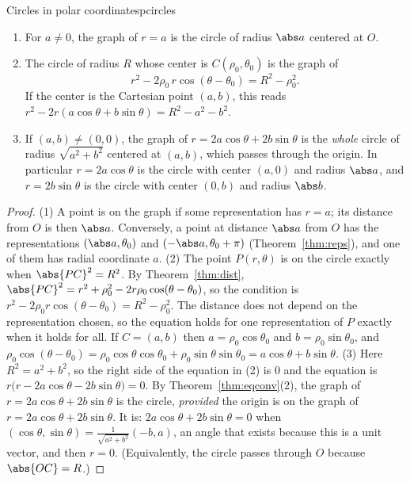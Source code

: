 \documentclass[11pt]{article}
\begin{document}
\begin{thm}{Circles in polar coordinates}{pcircles}
\begin{enumerate}[nosep]
  \item For $a\ne0$, the graph of $r=a$ is the circle of radius $\abs a$ centered at $O$.
  \item The circle of radius $R$ whose center is $C(\rho_0,\theta_0)$ is the graph of
  \[
  r^2-2\rho_0\,r\cos(\theta-\theta_0)=R^2-\rho_0^2 .
  \]
  If the center is the Cartesian point $(a,b)$, this reads $r^2-2r(a\cos\theta+b\sin\theta)=R^2-a^2-b^2$.
  \item If $(a,b)\ne(0,0)$, the graph of $r=2a\cos\theta+2b\sin\theta$ is the \emph{whole} circle of radius $\sqrt{a^2+b^2}$ centered at $(a,b)$, which passes through the origin. In particular $r=2a\cos\theta$ is the circle with center $(a,0)$ and radius $\abs a$, and $r=2b\sin\theta$ is the circle with center $(0,b)$ and radius $\abs b$.
\end{enumerate}
\end{thm}
\begin{proof}
(1) A point is on the graph if some representation has $r=a$; its distance from $O$ is then $\abs a$. Conversely, a point at distance $\abs a$ from $O$ has the representations $(\abs a,\theta_0)$ and $(-\abs a,\theta_0+\pi)$ (Theorem~\ref{thm:reps}), and one of them has radial coordinate $a$.
(2) The point $P(r,\theta)$ is on the circle exactly when $\abs{PC}^2=R^2$. By Theorem~\ref{thm:dist}, $\abs{PC}^2=r^2+\rho_0^2-2r\rho_0\cos(\theta-\theta_0)$, so the condition is $r^2-2\rho_0r\cos(\theta-\theta_0)=R^2-\rho_0^2$. The distance does not depend on the representation chosen, so the equation holds for one representation of $P$ exactly when it holds for all. If $C=(a,b)$ then $a=\rho_0\cos\theta_0$ and $b=\rho_0\sin\theta_0$, and $\rho_0\cos(\theta-\theta_0)=\rho_0\cos\theta\cos\theta_0+\rho_0\sin\theta\sin\theta_0=a\cos\theta+b\sin\theta$.
(3) Here $R^2=a^2+b^2$, so the right side of the equation in (2) is $0$ and the equation is $r\bigl(r-2a\cos\theta-2b\sin\theta\bigr)=0$. By Theorem~\ref{thm:eqconv}(2), the graph of $r=2a\cos\theta+2b\sin\theta$ is the circle, \emph{provided} the origin is on the graph of $r=2a\cos\theta+2b\sin\theta$. It is: $2a\cos\theta+2b\sin\theta=0$ when $(\cos\theta,\sin\theta)=\frac1{\sqrt{a^2+b^2}}(-b,a)$, an angle that exists because this is a unit vector, and then $r=0$. (Equivalently, the circle passes through $O$ because $\abs{OC}=R$.)
\end{proof}
\end{document}
